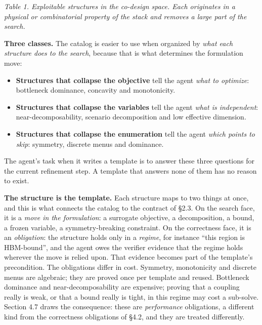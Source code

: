 \documentclass[11pt]{article}
\providecommand{\tightlist}{\setlength{\itemsep}{0pt}\setlength{\parskip}{0pt}}
\begin{document}
\emph{Table 1. Exploitable structures in the co-design space. Each originates in a physical or combinatorial property of the stack and removes a large part of the search.}

\textbf{Three classes.} The catalog is easier to use when organized by \emph{what each structure does to the search}, because that is what determines the formulation move:

\begin{itemize}
\tightlist
\item
  \textbf{Structures that collapse the objective} tell the agent \emph{what to optimize}: bottleneck dominance, concavity and monotonicity.
\item
  \textbf{Structures that collapse the variables} tell the agent \emph{what is independent}: near-decomposability, scenario decomposition and low effective dimension.
\item
  \textbf{Structures that collapse the enumeration} tell the agent \emph{which points to skip}: symmetry, discrete menus and dominance.
\end{itemize}

The agent's task when it writes a template is to answer these three questions for the current refinement step. A template that answers none of them has no reason to exist.

\textbf{The structure is the template.} Each structure maps to two things at once, and this is what connects the catalog to the contract of §2.3. On the search face, it is a \emph{move in the formulation}: a surrogate objective, a decomposition, a bound, a frozen variable, a symmetry-breaking constraint. On the correctness face, it is an \emph{obligation}: the structure holds only in a \emph{regime}, for instance ``this region is HBM-bound'', and the agent owes the verifier evidence that the regime holds wherever the move is relied upon. That evidence becomes part of the template's precondition. The obligations differ in cost. Symmetry, monotonicity and discrete menus are algebraic; they are proved once per template and reused. Bottleneck dominance and near-decomposability are expensive; proving that a coupling really is weak, or that a bound really is tight, in this regime may cost a sub-solve. Section 4.7 draws the consequence: these are \emph{performance} obligations, a different kind from the correctness obligations of §4.2, and they are treated differently.
\end{document}
